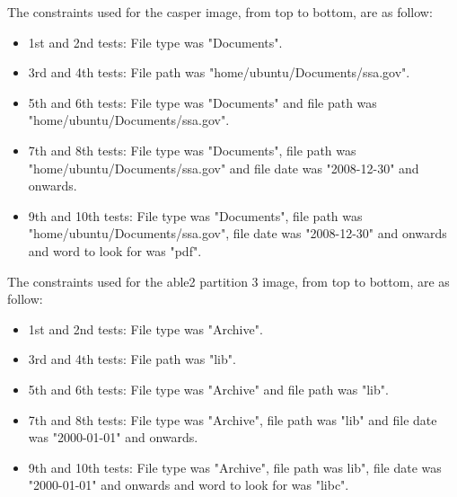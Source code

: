 The constraints used for the casper image, from top to bottom, are as follow:
\begin{itemize}
    \item 1st and 2nd tests: File type was "Documents".
    \item 3rd and 4th tests: File path was "home/ubuntu/Documents/ssa.gov".
    \item 5th and 6th tests: File type was "Documents" and file path was "home/ubuntu/Documents/ssa.gov".
    \item 7th and 8th tests: File type was "Documents", file path was "home/ubuntu/Documents/ssa.gov" and file date was "2008-12-30" and onwards.
    \item 9th and 10th tests: File type was "Documents", file path was "home/ubuntu/Documents/ssa.gov", file date was "2008-12-30" and onwards and word to look for was "pdf".
\end{itemize}

The constraints used for the able2 partition 3 image, from top to bottom, are as follow:
\begin{itemize}
    \item 1st and 2nd tests: File type was "Archive".
    \item 3rd and 4th tests: File path was "lib".
    \item 5th and 6th tests: File type was "Archive" and file path was "lib".
    \item 7th and 8th tests: File type was "Archive", file path was "lib" and file date was "2000-01-01" and onwards.
    \item 9th and 10th tests: File type was "Archive", file path was lib", file date was "2000-01-01" and onwards and word to look for was "libc".
\end{itemize}
